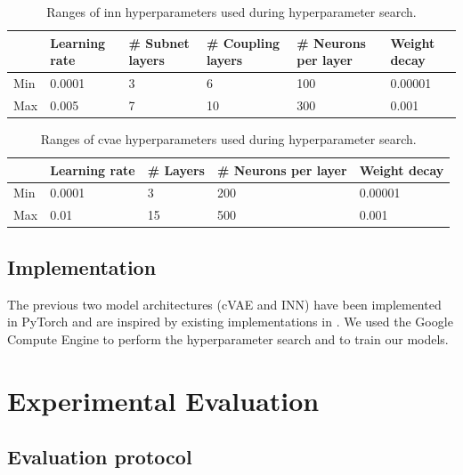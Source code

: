 \documentclass[conference]{IEEEtran}
\begin{document}
\begin{table}[ht]
    \scriptsize
    \caption{Ranges of inn hyperparameters used during hyperparameter search.}
    \label{tab:hyperparameter-ranges-inn}
    \centering
    \begin{tabularx}{\linewidth}{|l|C|C|C|C|C|}
    \hline
      & Learning rate & \# Subnet layers & \# Coupling layers & \# Neurons per layer & Weight decay \\
     \hline
     Min  & 0.0001 & 3 & 6 & 100 & 0.00001 \\
     Max  & 0.005 & 7 & 10 & 300 & 0.001 \\
     \hline
    \end{tabularx}
\end{table}

\begin{table}[ht]
    \scriptsize
    \caption{Ranges of cvae hyperparameters used during hyperparameter search.}
    \label{tab:hyperparameter-ranges-cvae}
    \centering
    \begin{tabularx}{\linewidth}{|l|C|C|C|C|}
    \hline
      & Learning rate & \# Layers & \# Neurons per layer & Weight decay \\
     \hline
     Min  & 0.0001 & 3 & 200 & 0.00001 \\
     Max  & 0.01 & 15 & 500 & 0.001 \\
     \hline
    \end{tabularx}
\end{table}

\subsection*{Implementation}

The previous two model architectures (cVAE and INN) have been implemented in PyTorch and are inspired by existing implementations in  \cite{graviraja2019, freia2020}. We used the Google Compute Engine to perform the hyperparameter search and to train our models.

\section*{Experimental Evaluation}

\subsection*{Evaluation protocol}
\end{document}
